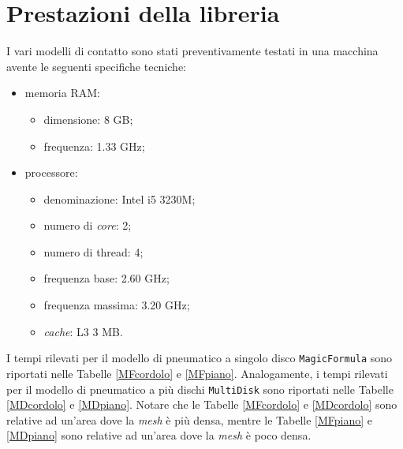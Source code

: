 \section{Prestazioni della libreria}
I vari modelli di contatto sono stati preventivamente testati in una macchina avente le seguenti specifiche tecniche:
\begin{itemize}
	\item memoria RAM:
	\begin{itemize}
		\item dimensione: 8 GB;
		\item frequenza: 1.33 GHz;
	\end{itemize}
	\item processore:
	\begin{itemize}
		\item denominazione: Intel i5 3230M;
		\item numero di \textit{core}: 2;
		\item numero di thread: 4;
		\item frequenza base: 2.60 GHz;
		\item frequenza massima: 3.20 GHz;
		\item \textit{cache}: L3 3 MB.
	\end{itemize}
\end{itemize}
I tempi rilevati per il modello di pneumatico a singolo disco \texttt{MagicFormula} sono riportati nelle Tabelle \ref{MFcordolo} e \ref{MFpiano}. Analogamente, i tempi rilevati per il modello di pneumatico a più dischi \texttt{MultiDisk} sono riportati nelle Tabelle \ref{MDcordolo} e \ref{MDpiano}. Notare che le Tabelle \ref{MFcordolo} e \ref{MDcordolo} sono relative ad un'area dove la \textit{mesh} è più densa, mentre le Tabelle \ref{MFpiano} e \ref{MDpiano} sono relative ad un'area dove la \textit{mesh} è poco densa.\\[1cm]

